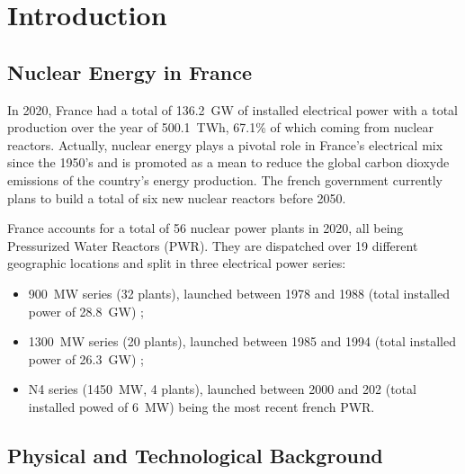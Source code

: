 
\chapter*{Introduction} %

\label{ch:introduction} %



\section{Nuclear Energy in France}

In 2020, France had a total of 136.2~GW of installed electrical power with a total production over the year of 500.1~TWh, 67.1\% of which coming from nuclear reactors. Actually, nuclear energy plays a pivotal role in France's electrical mix since the 1950's and is promoted as a mean to reduce the global carbon dioxyde emissions of the country's energy production. The french government currently plans to build a total of six new nuclear reactors before 2050.


\npar

France accounts for a total of 56 nuclear power plants in 2020, all being Pressurized Water Reactors (PWR). They are dispatched over 19 different geographic locations and split in three electrical power series:

\begin{itemize}
\item 900~MW series (32 plants), launched between 1978 and 1988 (total installed power of 28.8~GW) ;
\item 1300~MW series (20 plants), launched between 1985 and 1994 (total installed power of 26.3~GW) ;
\item N4 series (1450~MW, 4 plants), launched between 2000 and 202 (total installed powed of 6~MW) being the most recent french PWR.
\end{itemize}





\section{Physical and Technological Background}

